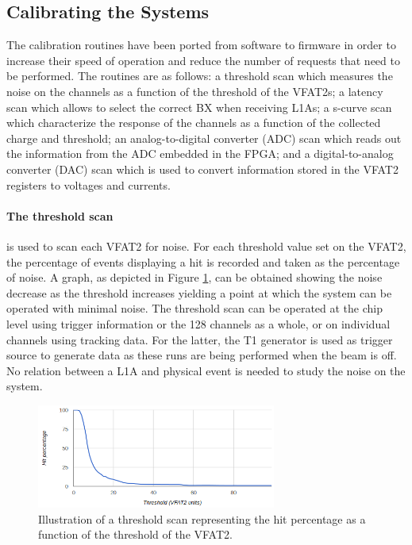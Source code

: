     \subsection{Calibrating the Systems}

      The calibration routines have been ported from software to firmware in order to increase their speed of operation and reduce the number of requests that need to be performed. The routines are as follows: a threshold scan which measures the noise on the channels as a function of the threshold of the VFAT2s; a latency scan which allows to select the correct BX when receiving L1As; a s-curve scan which characterize the response of the channels as a function of the collected charge and threshold; an analog-to-digital converter (ADC) scan which reads out the information from the ADC embedded in the FPGA; and a digital-to-analog converter (DAC) scan which is used to convert information stored in the VFAT2 registers to voltages and currents.

      \paragraph{The threshold scan} is used to scan each VFAT2 for noise. For each threshold value set on the VFAT2, the percentage of events displaying a hit is recorded and taken as the percentage of noise. A graph, as depicted in Figure \ref{fig:II-3-threshold-scan}, can be obtained showing the noise decrease as the threshold increases yielding a point at which the system can be operated with minimal noise. The threshold scan can be operated at the chip level using trigger information or the 128 channels as a whole, or on individual channels using tracking data. For the latter, the T1 generator is used as trigger source to generate data as these runs are being performed when the beam is off. No relation between a L1A and physical event is needed to study the noise on the system.

      \begin{figure}[h!]
        \centering
        \includegraphics[width=0.7\textwidth]{img/II-3-test-beam/threshold_scan.png}
        \caption{Illustration of a threshold scan representing the hit percentage as a function of the threshold of the VFAT2.}
        \label{fig:II-3-threshold-scan}
      \end{figure}

